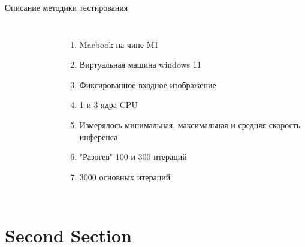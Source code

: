 \documentclass[aspectratio=169,xcolor=dvipsnames]{beamer}
\begin{document}
\begin{frame}{Описание методики тестирования}
    \begin{columns}[c] %

        \begin{figure}[h]
            \label{ris:ORTModelData}
        \end{figure}

        \begin{enumerate}
            \item Macbook на чипе M1
            \item Виртуальная машина windows 11
            \item Фиксированное входное изображение
            \item 1 и 3 ядра CPU
            \item Измерялось минимальная, максимальная и средняя скорость инференса
            \item "Разогев" 100 и 300 итераций
            \item 3000 основных итераций 
        \end{enumerate}

    \end{columns}
\end{frame}

\section{Second Section}
\end{document}
